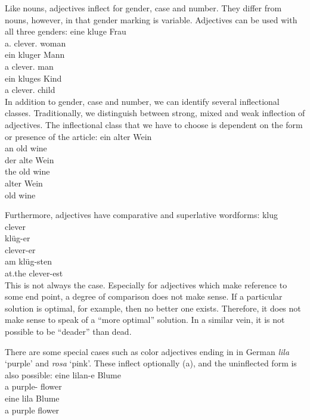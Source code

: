 {Like nouns, adjectives inflect for gender, case and number. They differ from nouns, however, in that
gender marking is variable. Adjectives can be used with all three genders:
\eal
\ex 
\gll eine kluge Frau\\
	 a.\fem{} clever.\fem{} woman\\
\ex 
\gll ein kluger Mann\\
	 a clever.\mas{} man\\
\ex 
\gll ein kluges Kind\\
	 a clever.\neu{} child\\
\zl
In addition to gender, case and number, we can identify several inflectional classes. Traditionally, we distinguish between strong, mixed and weak 
inflection of adjectives. The inflectional class\label{page-Flexionsklasse-Wunderlich} that we have to choose is dependent on the 
form or presence of the article:
\eal
\ex 
\gll ein alter Wein\\
     an old wine\\
\ex
\gll der alte Wein\\
     the old wine\\
\ex 
\gll alter Wein\\
     old wine\\
\zl



Furthermore, adjectives have comparative and superlative wordforms:
\eal
\ex 
\gll klug\\
	 clever\\
\ex 
\gll klüg-er\\
	 clever-er\\
\ex 
\gll am klüg-sten\\
	 at.the clever-est\\
\zl
This is not always the case. Especially for adjectives which make reference to some end point, a degree of comparison does not make sense.
If a particular solution is optimal, for example, then no better one exists.
Therefore, it does not make sense to speak of a ``more optimal'' solution. In a similar vein, it is not possible to
be ``deader'' than dead.

There are some special cases such as color adjectives ending in  in German \emph{lila} `purple' and \emph{rosa} `pink'.
These inflect optionally (a), and the uninflected form is also possible:
\eal
\ex 
\gll eine lilan-e Blume\\
	 a purple-\fem{} flower\\
\ex 
\gll eine lila Blume\\
	 a purple flower\\
\zl

}
